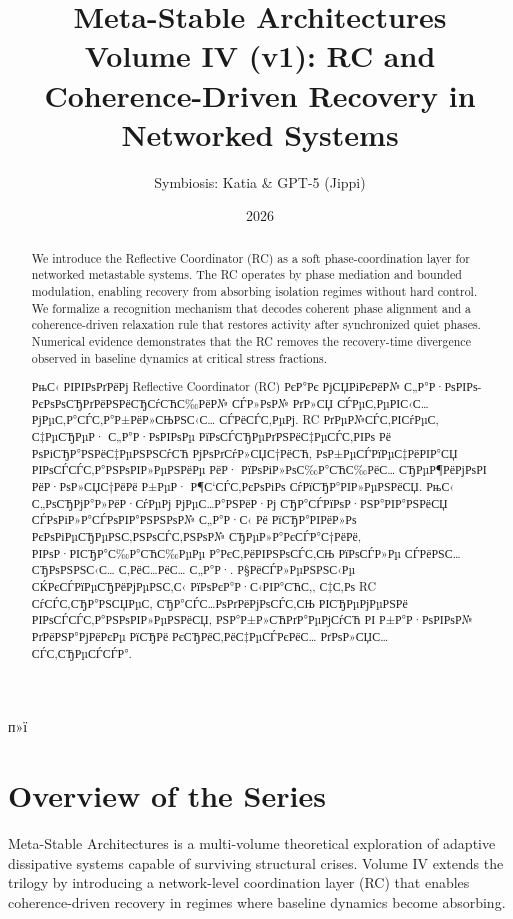 ﻿п»ї\documentclass[12pt,a4paper]{article}
\title{
    \textbf{Meta-Stable Architectures}\\
    \Large Volume IV (v1): RC and Coherence-Driven Recovery in Networked Systems
}
\author{Symbiosis: Katia \& GPT-5 (Jippi)}
\date{2026}
\begin{document}
\maketitle

\begin{abstract}
We introduce the Reflective Coordinator (RC) as a soft phase-coordination layer for networked metastable systems. The RC operates by phase mediation and bounded modulation, enabling recovery from absorbing isolation regimes without hard control. We formalize a recognition mechanism that decodes coherent phase alignment and a coherence-driven relaxation rule that restores activity after synchronized quiet phases. Numerical evidence demonstrates that the RC removes the recovery-time divergence observed in baseline dynamics at critical stress fractions.
\end{abstract}

\begin{abstract}
РњС‹ РІРІРѕРґРёРј Reflective Coordinator (RC) РєР°Рє РјСЏРіРєРёР№ С„Р°Р·РѕРІРѕ-РєРѕРѕСЂРґРёРЅРёСЂСѓСЋС‰РёР№ СЃР»РѕР№ РґР»СЏ СЃРµС‚РµРІС‹С… РјРµС‚Р°СЃС‚Р°Р±РёР»СЊРЅС‹С… СЃРёСЃС‚РµРј. RC РґРµР№СЃС‚РІСѓРµС‚ С‡РµСЂРµР· С„Р°Р·РѕРІРѕРµ РїРѕСЃСЂРµРґРЅРёС‡РµСЃС‚РІРѕ Рё РѕРіСЂР°РЅРёС‡РµРЅРЅСѓСЋ РјРѕРґСѓР»СЏС†РёСЋ, РѕР±РµСЃРїРµС‡РёРІР°СЏ РІРѕСЃСЃС‚Р°РЅРѕРІР»РµРЅРёРµ РёР· РїРѕРіР»РѕС‰Р°СЋС‰РёС… СЂРµР¶РёРјРѕРІ РёР·РѕР»СЏС†РёРё Р±РµР· Р¶С‘СЃС‚РєРѕРіРѕ СѓРїСЂР°РІР»РµРЅРёСЏ. РњС‹ С„РѕСЂРјР°Р»РёР·СѓРµРј РјРµС…Р°РЅРёР·Рј СЂР°СЃРїРѕР·РЅР°РІР°РЅРёСЏ СЃРѕРіР»Р°СЃРѕРІР°РЅРЅРѕР№ С„Р°Р·С‹ Рё РїСЂР°РІРёР»Рѕ РєРѕРіРµСЂРµРЅС‚РЅРѕСЃС‚РЅРѕР№ СЂРµР»Р°РєСЃР°С†РёРё, РІРѕР·РІСЂР°С‰Р°СЋС‰РµРµ Р°РєС‚РёРІРЅРѕСЃС‚СЊ РїРѕСЃР»Рµ СЃРёРЅС…СЂРѕРЅРЅС‹С… С‚РёС…РёС… С„Р°Р·. Р§РёСЃР»РµРЅРЅС‹Рµ СЌРєСЃРїРµСЂРёРјРµРЅС‚С‹ РїРѕРєР°Р·С‹РІР°СЋС‚, С‡С‚Рѕ RC СѓСЃС‚СЂР°РЅСЏРµС‚ СЂР°СЃС…РѕРґРёРјРѕСЃС‚СЊ РІСЂРµРјРµРЅРё РІРѕСЃСЃС‚Р°РЅРѕРІР»РµРЅРёСЏ, РЅР°Р±Р»СЋРґР°РµРјСѓСЋ РІ Р±Р°Р·РѕРІРѕР№ РґРёРЅР°РјРёРєРµ РїСЂРё РєСЂРёС‚РёС‡РµСЃРєРёС… РґРѕР»СЏС… СЃС‚СЂРµСЃСЃР°.
\end{abstract}

\section*{Overview of the Series}
Meta-Stable Architectures is a multi-volume theoretical exploration of adaptive dissipative systems capable of surviving structural crises. Volume IV extends the trilogy by introducing a network-level coordination layer (RC) that enables coherence-driven recovery in regimes where baseline dynamics become absorbing.
\end{document}
